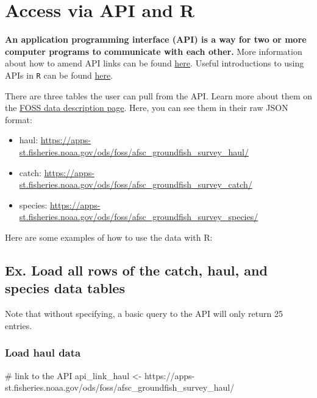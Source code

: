 \documentclass[
  letterpaper,
  oneside,
  open=any]{scrbook}
\newenvironment{Shaded}{\begin{snugshade}}{\end{snugshade}}
\newcommand{\CommentTok}[1]{\textcolor[rgb]{0.37,0.37,0.37}{#1}}
\newcommand{\NormalTok}[1]{\textcolor[rgb]{0.00,0.23,0.31}{#1}}
\newcommand{\OtherTok}[1]{\textcolor[rgb]{0.00,0.23,0.31}{#1}}
\newcommand{\StringTok}[1]{\textcolor[rgb]{0.13,0.47,0.30}{#1}}
\providecommand{\tightlist}{%
  \setlength{\itemsep}{0pt}\setlength{\parskip}{0pt}}\usepackage{longtable,booktabs,array}
\begin{document}
\chapter{Access via API and R}\label{access-via-api-and-r}

\textbf{An application programming interface (API) is a way for two or
more computer programs to communicate with each other.} More information
about how to amend API links can be found
\href{https://docs.oracle.com/en/database/oracle/oracle-rest-data-services/22.3/books.html\#AELIG90103/}{here}.
Useful introductions to using APIs in \texttt{R} can be found
\href{https://www.dataquest.io/blog/r-api-tutorial/}{here}.

There are three tables the user can pull from the API. Learn more about
them on the
\href{https://afsc-gap-products.github.io/gap_products/content/foss-metadata.html}{FOSS
data description page}. Here, you can see them in their raw JSON format:

\begin{itemize}
\tightlist
\item
  haul:
  \url{https://apps-st.fisheries.noaa.gov/ods/foss/afsc_groundfish_survey_haul/}
\item
  catch:
  \url{https://apps-st.fisheries.noaa.gov/ods/foss/afsc_groundfish_survey_catch/}
\item
  species:
  \url{https://apps-st.fisheries.noaa.gov/ods/foss/afsc_groundfish_survey_species/}
\end{itemize}

Here are some examples of how to use the data with R:

\section{Ex. Load all rows of the catch, haul, and species data
tables}\label{ex.-load-all-rows-of-the-catch-haul-and-species-data-tables}

Note that without specifying, a basic query to the API will only return
25 entries.

\subsection{Load haul data}\label{load-haul-data}

\begin{Shaded}
\begin{Highlighting}[]
\CommentTok{\# link to the API}
\NormalTok{api\_link\_haul }\OtherTok{\textless{}{-}} \StringTok{\textquotesingle{}https://apps{-}st.fisheries.noaa.gov/ods/foss/afsc\_groundfish\_survey\_haul/\textquotesingle{}}
\end{Highlighting}
\end{Shaded}
\end{document}
